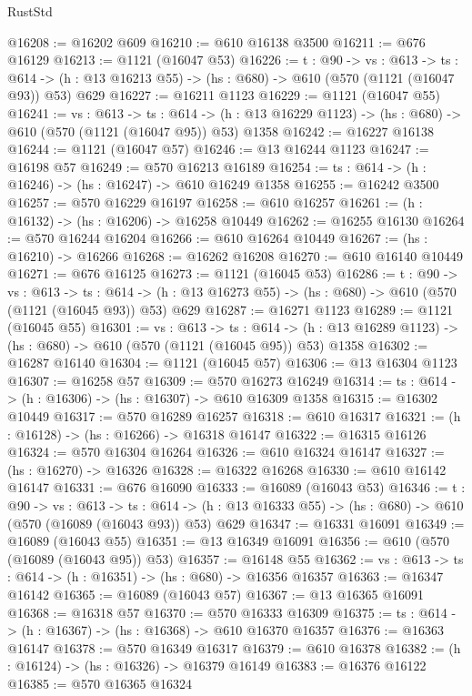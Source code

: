 \begin{lexlean}{RustStd}
\begin{coremodule}
@16208 := @16202 @609
@16210 := @610 @16138 @3500
@16211 := @676 @16129
@16213 := @1121 (@16047 @53)
@16226 := {t : @90} ->
  {vs : @613} ->
  {ts : @614} -> (h : @13 @16213 @55) -> (hs : @680) -> @610 (@570 (@1121 (@16047 @93)) @53) @629
@16227 := @16211 @1123
@16229 := @1121 (@16047 @55)
@16241 := {vs : @613} ->
  {ts : @614} -> (h : @13 @16229 @1123) -> (hs : @680) -> @610 (@570 (@1121 (@16047 @95)) @53) @1358
@16242 := @16227 @16138
@16244 := @1121 (@16047 @57)
@16246 := @13 @16244 @1123
@16247 := @16198 @57
@16249 := @570 @16213 @16189
@16254 := {ts : @614} -> (h : @16246) -> (hs : @16247) -> @610 @16249 @1358
@16255 := @16242 @3500
@16257 := @570 @16229 @16197
@16258 := @610 @16257
@16261 := (h : @16132) -> (hs : @16206) -> @16258 @10449
@16262 := @16255 @16130
@16264 := @570 @16244 @16204
@16266 := @610 @16264 @10449
@16267 := (hs : @16210) -> @16266
@16268 := @16262 @16208
@16270 := @610 @16140 @10449
@16271 := @676 @16125
@16273 := @1121 (@16045 @53)
@16286 := {t : @90} ->
  {vs : @613} ->
  {ts : @614} -> (h : @13 @16273 @55) -> (hs : @680) -> @610 (@570 (@1121 (@16045 @93)) @53) @629
@16287 := @16271 @1123
@16289 := @1121 (@16045 @55)
@16301 := {vs : @613} ->
  {ts : @614} -> (h : @13 @16289 @1123) -> (hs : @680) -> @610 (@570 (@1121 (@16045 @95)) @53) @1358
@16302 := @16287 @16140
@16304 := @1121 (@16045 @57)
@16306 := @13 @16304 @1123
@16307 := @16258 @57
@16309 := @570 @16273 @16249
@16314 := {ts : @614} -> (h : @16306) -> (hs : @16307) -> @610 @16309 @1358
@16315 := @16302 @10449
@16317 := @570 @16289 @16257
@16318 := @610 @16317
@16321 := (h : @16128) -> (hs : @16266) -> @16318 @16147
@16322 := @16315 @16126
@16324 := @570 @16304 @16264
@16326 := @610 @16324 @16147
@16327 := (hs : @16270) -> @16326
@16328 := @16322 @16268
@16330 := @610 @16142 @16147
@16331 := @676 @16090
@16333 := @16089 (@16043 @53)
@16346 := {t : @90} ->
  {vs : @613} ->
  {ts : @614} -> (h : @13 @16333 @55) -> (hs : @680) -> @610 (@570 (@16089 (@16043 @93)) @53) @629
@16347 := @16331 @16091
@16349 := @16089 (@16043 @55)
@16351 := @13 @16349 @16091
@16356 := @610 (@570 (@16089 (@16043 @95)) @53)
@16357 := @16148 @55
@16362 := {vs : @613} -> {ts : @614} -> (h : @16351) -> (hs : @680) -> @16356 @16357
@16363 := @16347 @16142
@16365 := @16089 (@16043 @57)
@16367 := @13 @16365 @16091
@16368 := @16318 @57
@16370 := @570 @16333 @16309
@16375 := {ts : @614} -> (h : @16367) -> (hs : @16368) -> @610 @16370 @16357
@16376 := @16363 @16147
@16378 := @570 @16349 @16317
@16379 := @610 @16378
@16382 := (h : @16124) -> (hs : @16326) -> @16379 @16149
@16383 := @16376 @16122
@16385 := @570 @16365 @16324

\end{coremodule}
\end{lexlean}

